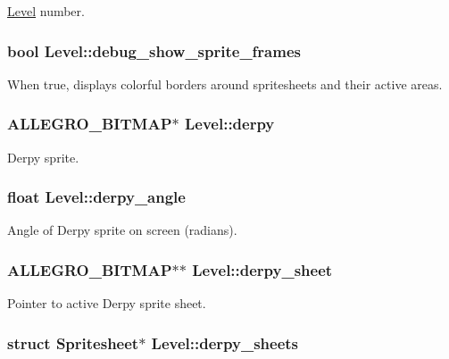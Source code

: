 \hyperlink{structLevel}{Level} number. \hypertarget{structLevel_a1df786b74cff642434ea6587e6141b4d}{
\subsubsection[{debug\-\_\-show\-\_\-sprite\-\_\-frames}]{\setlength{\rightskip}{0pt plus 5cm}bool Level\-::debug\-\_\-show\-\_\-sprite\-\_\-frames}}\label{structLevel_a1df786b74cff642434ea6587e6141b4d}
When true, displays colorful borders around spritesheets and their active areas. \hypertarget{structLevel_ae33832497116b7a0c184959bbde21ee5}{
\subsubsection[{derpy}]{\setlength{\rightskip}{0pt plus 5cm}A\-L\-L\-E\-G\-R\-O\-\_\-\-B\-I\-T\-M\-A\-P$\ast$ Level\-::derpy}}\label{structLevel_ae33832497116b7a0c184959bbde21ee5}
Derpy sprite. \hypertarget{structLevel_a364d35d138549a87532d959288283956}{
\subsubsection[{derpy\-\_\-angle}]{\setlength{\rightskip}{0pt plus 5cm}float Level\-::derpy\-\_\-angle}}\label{structLevel_a364d35d138549a87532d959288283956}
Angle of Derpy sprite on screen (radians). \hypertarget{structLevel_a0e02f3a5674a2ad3c23de22b6a4ed044}{
\subsubsection[{derpy\-\_\-sheet}]{\setlength{\rightskip}{0pt plus 5cm}A\-L\-L\-E\-G\-R\-O\-\_\-\-B\-I\-T\-M\-A\-P$\ast$$\ast$ Level\-::derpy\-\_\-sheet}}\label{structLevel_a0e02f3a5674a2ad3c23de22b6a4ed044}
Pointer to active Derpy sprite sheet. \hypertarget{structLevel_aad19c0af5ac43ceb72df311d89bd4297}{
\subsubsection[{derpy\-\_\-sheets}]{\setlength{\rightskip}{0pt plus 5cm}struct {\bf Spritesheet}$\ast$ Level\-::derpy\-\_\-sheets}}\label{structLevel_aad19c0af5ac43ceb72df311d89bd4297}
